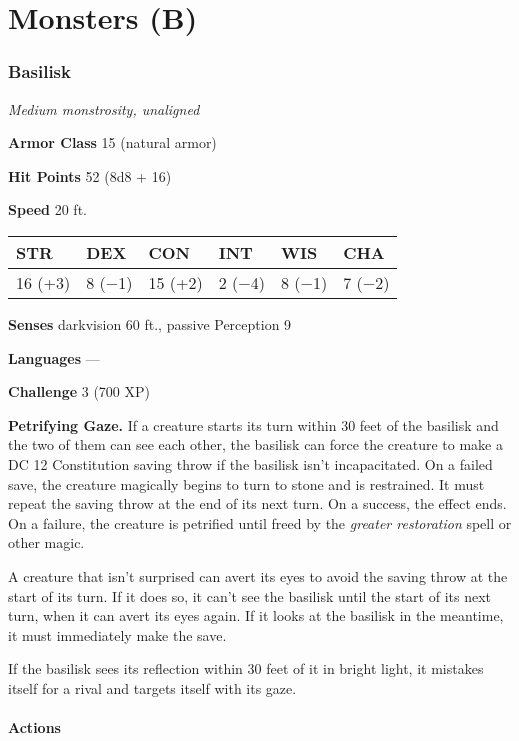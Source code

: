 \documentclass[
]{article}
\date{}
\begin{document}
\hypertarget{monsters-b}{%
\section{Monsters (B)}\label{monsters-b}}

\hypertarget{basilisk}{%
\subsubsection{Basilisk}\label{basilisk}}

\emph{Medium monstrosity, unaligned}

\textbf{Armor Class} 15 (natural armor)

\textbf{Hit Points} 52 (8d8 + 16)

\textbf{Speed} 20 ft.

\begin{longtable}[]{@{}llllll@{}}
\toprule
STR & DEX & CON & INT & WIS & CHA\tabularnewline
\midrule
\endhead
16 (+3) & 8 (−1) & 15 (+2) & 2 (−4) & 8 (−1) & 7 (−2)\tabularnewline
\bottomrule
\end{longtable}

\textbf{Senses} darkvision 60 ft., passive Perception 9

\textbf{Languages} ---

\textbf{Challenge} 3 (700 XP)

\textbf{Petrifying Gaze.} If a creature starts its turn within 30 feet
of the basilisk and the two of them can see each other, the basilisk can
force the creature to make a DC 12 Constitution saving throw if the
basilisk isn't incapacitated. On a failed save, the creature magically
begins to turn to stone and is restrained. It must repeat the saving
throw at the end of its next turn. On a success, the effect ends. On a
failure, the creature is petrified until freed by the \emph{greater
restoration} spell or other magic.

A creature that isn't surprised can avert its eyes to avoid the saving
throw at the start of its turn. If it does so, it can't see the basilisk
until the start of its next turn, when it can avert its eyes again. If
it looks at the basilisk in the meantime, it must immediately make the
save.

If the basilisk sees its reflection within 30 feet of it in bright
light, it mistakes itself for a rival and targets itself with its gaze.

\hypertarget{actions}{%
\paragraph{Actions}\label{actions}}
\end{document}
